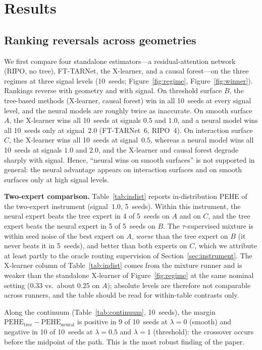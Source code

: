 \documentclass[pdflatex,sn-mathphys-num]{sn-jnl}
\newcommand{\PEHE}{\mathrm{PEHE}}
\begin{document}
\section{Results}

\subsection{Ranking reversals across geometries}
\label{sec:reversal}
We first compare four standalone estimators---a residual-attention network (RIPO, no tree), FT-TARNet, the X-learner, and a causal forest---on the three regimes at three signal levels (10~seeds; Figure~\ref{fig:regime}, Figure~\ref{fig:winner}). \newpage Rankings reverse with geometry and with signal. On threshold surface $B$, the tree-based methods (X-learner, causal forest) win in all 10~seeds at every signal level, and the neural models are roughly twice as inaccurate. On smooth surface $A$, the X-learner wins all 10~seeds at signals $0.5$ and $1.0$, and a neural model wins all 10~seeds only at signal~$2.0$ (FT-TARNet~6, RIPO~4). On interaction surface $C$, the X-learner wins all 10~seeds at signal~$0.5$, whereas a neural model wins all 10~seeds at signals $1.0$ and $2.0$, and the X-learner and causal forest degrade sharply with signal. Hence, ``neural wins on smooth surfaces'' is not supported in general: the neural advantage appears on interaction surfaces and on smooth surfaces only at high signal levels.

\medskip\noindent\textbf{Two-expert comparison.} Table~\ref{tab:indist} reports in-distribution PEHE of the two-expert instrument (signal~$1.0$, 5~seeds). Within this instrument, the neural expert beats the tree expert in 4 of 5~seeds on $A$ and on $C$, and the tree expert beats the neural expert in 5 of 5~seeds on $B$. The $\tau$-supervised mixture is within seed noise of the best expert on $A$, \emph{worse} than the tree expert on $B$ (it never beats it in 5~seeds), and better than both experts on $C$, which we attribute at least partly to the oracle routing supervision of Section~\ref{sec:instrument}. The X-learner column of Table~\ref{tab:indist} comes from the mixture runner and is weaker than the standalone X-learner of Figure~\ref{fig:regime} at the same nominal setting ($0.33$ vs.\ about $0.25$ on $A$); absolute levels are therefore not comparable across runners, and the table should be read for within-table contrasts only.

Along the continuum (Table~\ref{tab:continuum}, 10~seeds), the margin $\PEHE_{\mathrm{tree}}-\PEHE_{\mathrm{neural}}$ is positive in 9 of 10~seeds at $\lambda=0$ (smooth) and negative in 10 of 10~seeds at $\lambda=0.5$ and $\lambda=1$ (threshold): the crossover occurs before the midpoint of the path. This is the most robust finding of the paper.
\end{document}
